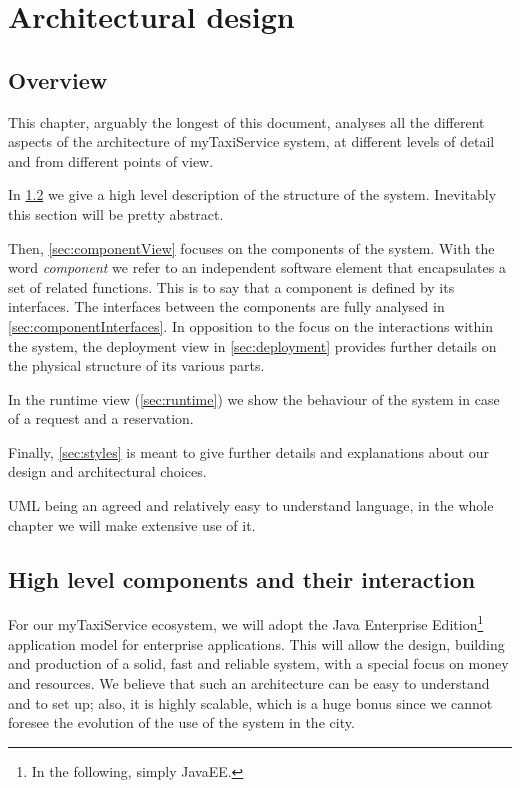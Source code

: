 \chapter{Architectural design} \label{chap:architectural}


\section{Overview}
This chapter, arguably the longest of this document, analyses all the different aspects of the architecture of myTaxiService system, at different levels of detail and from different points of view.

In \cref{sec:highlevel} we give a high level description of the structure of the system. Inevitably this section will be pretty abstract.

Then, \cref{sec:componentView} focuses on the components of the system. With the word \emph{component} we refer to an independent software element that encapsulates a set of related functions. This is to say that a component is defined by its interfaces. The interfaces between the components are fully analysed in \cref{sec:componentInterfaces}. In opposition to the focus on the interactions within the system, the deployment view in \cref{sec:deployment} provides further details on the physical structure of its various parts.

In the runtime view (\cref{sec:runtime}) we show the behaviour of the system in case of a request and a reservation. 

Finally, \cref{sec:styles} is meant to give further details and explanations about our design and architectural choices. 

UML being an agreed and relatively easy to understand language, in the whole chapter we will make extensive use of it.


\section{High level components and their interaction}\label{sec:highlevel}
For our myTaxiService ecosystem, we will adopt the Java Enterprise Edition\footnote{In the following, simply JavaEE.} application model for enterprise applications. This will allow the design, building and production of a solid, fast and reliable system, with a special focus on money and resources. We believe that such an architecture can be easy to understand and to set up; also, it is highly scalable, which is a huge bonus since we cannot foresee the evolution of the use of the system in the city.

